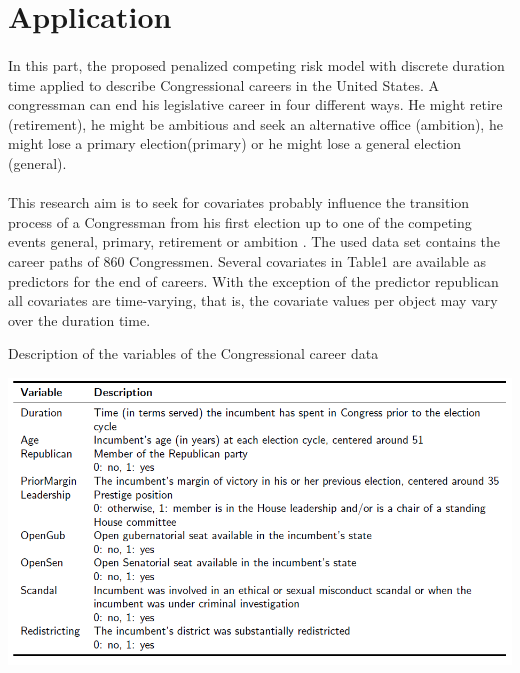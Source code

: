 \documentclass[]{article}
\begin{document}
    \section{Application}
        \paragraph{}In this part, the proposed penalized competing risk model with discrete duration time applied to describe Congressional careers in the United States. A congressman can end his legislative career in four different ways. He might retire (retirement), he might be ambitious and seek an alternative office (ambition), he might lose a primary election(primary) or he might lose a general election (general).
        \paragraph{}This research aim is to seek for covariates probably influence the transition process of  a Congressman from his first election up to one of the competing events general, primary, retirement or ambition . The used data set contains the career paths of  860 Congressmen. Several covariates  in Table1 are available as predictors for the end of careers. With the exception of the predictor republican all covariates are time-varying, that is, the covariate values per object may vary over the duration time.
        \begin{table}
            \caption{Description of the variables of the Congressional career data}
            \label{Table1}
            \includegraphics[width=\linewidth]{Table1.png}
        \end{table}
\end{document}
